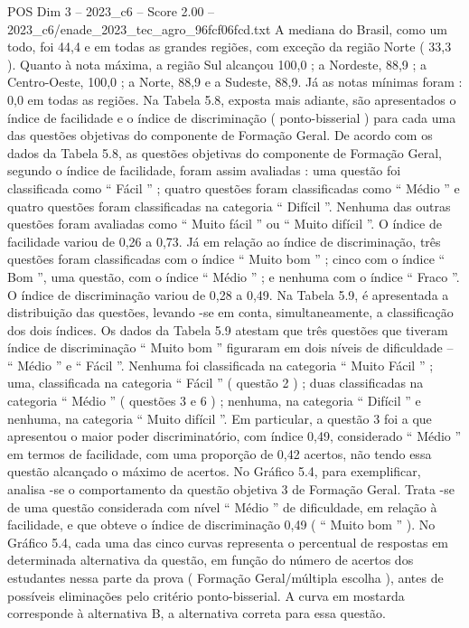\begin{textsample}{POS Dim 3 – 2023\_c6 – Score 2.00 – 2023\_c6/enade\_2023\_tec\_agro\_96fcf06fcd.txt}
A mediana do Brasil, como um todo, foi 44,4 e em todas as grandes regiões, com exceção da região Norte ( 33,3 ).
Quanto à nota máxima, a região Sul alcançou 100,0 ; a Nordeste, 88,9 ; a Centro-Oeste, 100,0 ; a Norte, 88,9 e a Sudeste, 88,9.
Já as notas mínimas foram : 0,0 em todas as regiões.
Na Tabela 5.8, exposta mais adiante, são apresentados o índice de facilidade e o índice de discriminação ( ponto-bisserial ) para cada uma das questões objetivas do componente de Formação Geral.
De acordo com os dados da Tabela 5.8, as questões objetivas do componente de Formação Geral, segundo o índice de facilidade, foram assim avaliadas : uma questão foi classificada como “ Fácil ” ; quatro questões foram classificadas como “ Médio ” e quatro questões foram classificadas na categoria “ Difícil ”.
Nenhuma das outras questões foram avaliadas como “ Muito fácil ” ou “ Muito difícil ”.
O índice de facilidade variou de 0,26 a 0,73.
Já em relação ao índice de discriminação, três questões foram classificadas com o índice “ Muito bom ” ; cinco com o índice “ Bom ”, uma questão, com o índice “ Médio ” ; e nenhuma com o índice “ Fraco ”.
O índice de discriminação variou de 0,28 a 0,49.
Na Tabela 5.9, é apresentada a distribuição das questões, levando -se em conta, simultaneamente, a classificação dos dois índices.
Os dados da Tabela 5.9 atestam que três questões que tiveram índice de discriminação “ Muito bom ” figuraram em dois níveis de dificuldade – “ Médio ” e “ Fácil ”.
Nenhuma foi classificada na categoria “ Muito Fácil ” ; uma, classificada na categoria “ Fácil ” ( questão 2 ) ; duas classificadas na categoria “ Médio ” ( questões 3 e 6 ) ; nenhuma, na categoria “ Difícil ” e nenhuma, na categoria “ Muito difícil ”.
Em particular, a questão 3 foi a que apresentou o maior poder discriminatório, com índice 0,49, considerado “ Médio ” em termos de facilidade, com uma proporção de 0,42 acertos, não tendo essa questão alcançado o máximo de acertos.
No Gráfico 5.4, para exemplificar, analisa -se o comportamento da questão objetiva 3 de Formação Geral.
Trata -se de uma questão considerada com nível “ Médio ” de dificuldade, em relação à facilidade, e que obteve o índice de discriminação 0,49 ( “ Muito bom ” ).
No Gráfico 5.4, cada uma das cinco curvas representa o percentual de respostas em determinada alternativa da questão, em função do número de acertos dos estudantes nessa parte da prova ( Formação Geral/múltipla escolha ), antes de possíveis eliminações pelo critério ponto-bisserial.
A curva em mostarda corresponde à alternativa B, a alternativa correta para essa questão.

\end{textsample}
